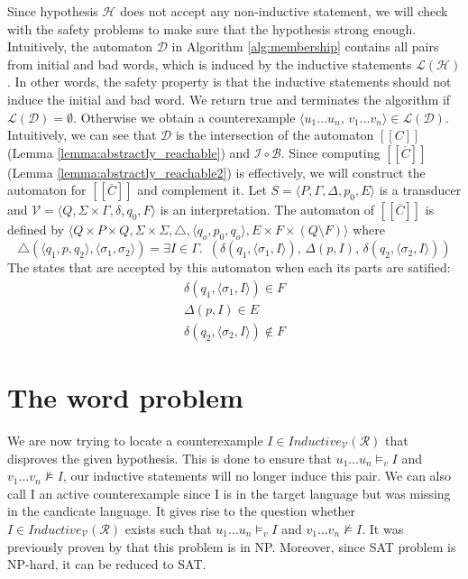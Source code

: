 Since hypothesis $\mathcal{H}$ does not accept any 
non-inductive statement, we will check with the safety problems
to make sure that the hypothesis strong enough.
Intuitively, the automaton $\mathcal{D}$ in Algorithm \ref*{alg:membership} contains all pairs from initial and bad words,
which is induced by the inductive statements $\mathcal{L}(\mathcal{H})$.
In other words, the safety property is that the inductive statements should not induce the
initial and bad word. We return true and terminates the algorithm if $\mathcal{L}(\mathcal{D}) = \emptyset$.
Otherwise we obtain a counterexample 
$\langle u_1 \dots u_n, \, v_1 \dots v_n \rangle \in \mathcal{L}(\mathcal{D})$.
Intuitively, we can see that $\mathcal{D}$ is the intersection of
the automaton $[[C]]$ (Lemma \ref{lemma:abstractly_reachable}) and $\mathcal{I} \circ  \mathcal{B}$.
Since computing $[[\overline{C}]]$ (Lemma \ref{lemma:abstractly_reachable2}) is effectively, we will construct the automaton for $[[\overline{C}]]$ and complement it.
Let $S =  \langle P, \Gamma, \Delta, p_0, E \rangle$ 
is a transducer and  $\mathcal{V} =  \langle Q, \Sigma \times \Gamma, \delta, q_0, F \rangle$ is 
an interpretation. The automaton of $[[\overline{C}]]$ 
is defined by $\langle Q \times P \times Q, \Sigma \times \Sigma, \triangle, \langle q_o,  p_0, q_o \rangle, 
E \times F \times (Q \setminus F) \rangle$ where
\begin{equation*}
    \triangle(\langle q_1, p, q_2 \rangle, \langle \sigma_1, \sigma_2 \rangle) =  \exists I \in \Gamma. \,\,\,
    (\delta(q_1, \langle \sigma_1, I \rangle) ,\, \Delta(p, I) ,\, \delta(q_2, \langle \sigma_2, I \rangle))
\end{equation*}
The states that are accepted by this automaton when each its parts are satified: 
\begin{align*} 
    \delta(q_1, \langle \sigma_1, I \rangle) \in  F \\
    \Delta(p, I) \in E \\
    \delta(q_2, \langle \sigma_2, I \rangle) \notin  F
\end{align*}

\section{The word problem}
We are now trying to locate a counterexample $I \in Inductive_{\mathcal{V}}(\mathcal{R})$ that disproves the given hypothesis. 
This is done to ensure that $u_1 \dots u_n \models_v I$
and $v_1 \dots v_n \not\models I$, our inductive statements will no longer induce this pair.
We can also call I an active counterexample since I is in the target language but was missing in 
the candicate language. 
It gives rise to the question whether $I \in Inductive_{\mathcal{V}}(\mathcal{R})$ exists such that $u_1 \dots u_n \models_v I$
and $v_1 \dots v_n \not\models I$.
It was previously proven by \cite{Welzel2023InductiveSts} that this problem is in NP.
Moreover, since SAT problem is NP-hard, it can be reduced to SAT.

